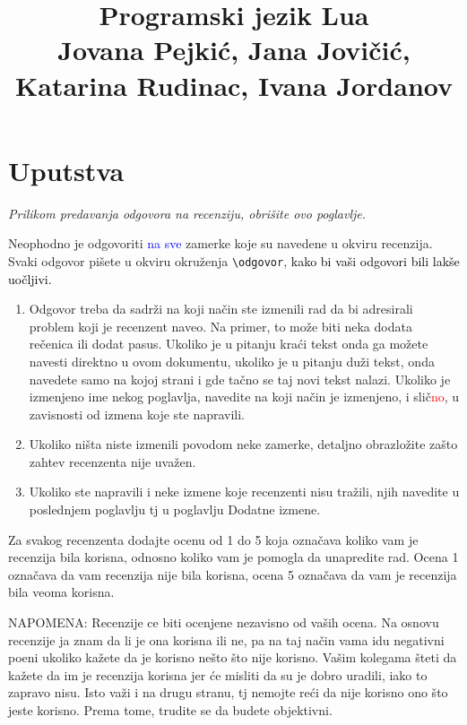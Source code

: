 \documentclass[a4paper]{report}
\newcommand{\odgovor}[1]{\textcolor{black}{#1}}
\newcommand{\odgovorAutora}[1]{\textcolor{blue}{#1}}
\newcommand{\note}[1]{\textcolor{red}{#1}}
\begin{document}
\title{Programski jezik Lua\\ \small{Jovana Pejkić, Jana Jovičić, Katarina Rudinac, Ivana Jordanov}}

\maketitle

\tableofcontents

\chapter{Uputstva}
\emph{Prilikom predavanja odgovora na recenziju, obrišite ovo poglavlje.}

Neophodno je odgovoriti \odgovorAutora{na sve} zamerke koje su navedene u okviru recenzija. Svaki odgovor pišete u okviru okruženja \verb"\odgovor", \odgovor{kako bi vaši odgovori bili lakše uočljivi.} 
\begin{enumerate}

\item Odgovor treba da sadrži na koji način ste izmenili rad da bi adresirali problem koji je recenzent naveo. Na primer, to može biti neka dodata rečenica ili dodat pasus. Ukoliko je u pitanju kraći tekst onda ga možete navesti direktno u ovom dokumentu, ukoliko je u pitanju duži tekst, onda navedete samo na kojoj strani i gde tačno se taj novi tekst nalazi. Ukoliko je izmenjeno ime nekog poglavlja, navedite na koji način je izmenjeno, i slič\note{no}, u zavisnosti od izmena koje ste napravili. 

\item Ukoliko ništa niste izmenili povodom neke zamerke, detaljno obrazložite zašto zahtev recenzenta nije uvažen.

\item Ukoliko ste napravili i neke izmene koje recenzenti nisu tražili, njih navedite u poslednjem poglavlju tj u poglavlju Dodatne izmene.
\end{enumerate}

Za svakog recenzenta dodajte ocenu od 1 do 5 koja označava koliko vam je recenzija bila korisna, odnosno koliko vam je pomogla da unapredite rad. Ocena 1 označava da vam recenzija nije bila korisna, ocena 5 označava da vam je recenzija bila veoma korisna. 

NAPOMENA: Recenzije ce biti ocenjene nezavisno od vaših ocena. Na osnovu recenzije ja znam da li je ona korisna ili ne, pa na taj način vama idu negativni poeni ukoliko kažete da je korisno nešto što nije korisno. Vašim kolegama šteti da kažete da im je recenzija korisna jer će misliti da su je dobro uradili, iako to zapravo nisu. Isto važi i na drugu stranu, tj nemojte reći da nije korisno ono što jeste korisno. Prema tome, trudite se da budete objektivni. 
\end{document}

